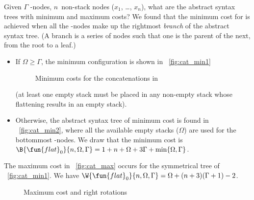 Given \(\Gamma\) \hyp{}nodes, \(n\)~non\hyp{}stack nodes
(\(x_1\), \dots, \(x_n\)), what are the abstract syntax trees with
minimum and maximum costs? We found that the minimum cost for
 is achieved when all the
\hyp{}nodes make up the rightmost
\emph{branch} of the abstract syntax tree. (A
branch is a series of nodes such that one is the parent of the next,
from the root to a leaf.)
\begin{itemize}

  \item If \(\Omega \geqslant \Gamma\), the minimum configuration is
  shown in \fig~\ref{fig:cat_min1}
\begin{figure}
\centering
{}
\quad
{}
\caption{Minimum costs for the concatenations in }
\label{fig:cat_min}
\end{figure}
  (at least one empty stack must be placed in any non\hyp{}empty stack
  whose flattening results in an empty stack).

\item Otherwise, the abstract syntax tree of minimum cost is found in
  \fig~\ref{fig:cat_min2}, where all the available empty stacks
  (\(\Omega\)) are used for the bottommost \hyp{}nodes. We
  draw that the minimum cost
  is
  \(\B{\fun{flat}_0}{n,\Omega,\Gamma} = 1 + n + \Omega + 3\Gamma +
  \min\{\Omega,\Gamma\}\).

\end{itemize}

The maximum cost in
\fig~\ref{fig:cat_max} occurs for the symmetrical tree of
\fig~\ref{fig:cat_min1}. We
have
\(\W{\fun{flat}_0}{n,\Omega,\Gamma} = \Omega + (n+3)(\Gamma+1) - 2\).
\begin{figure}[t]
\centering
{}
\qquad
{}
\qquad
{}
\caption{Maximum cost and right rotations}
\end{figure}

